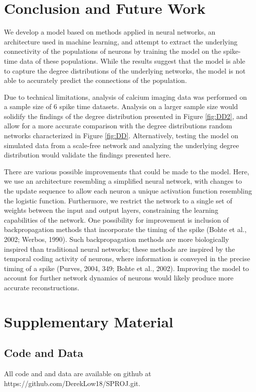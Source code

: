 \documentclass[11pt,titlepage]{article}
\begin{document}
\clearpage
\section{Conclusion and Future Work}
We develop a model based on methods applied in neural networks, an architecture used in machine learning, and attempt to extract the underlying connectivity of the populations of neurons by training the model on the spike-time data of these populations. While the results suggest that the model is able to capture the degree distributions of the underlying networks, the model is not able to accurately predict the connections of the population.\par
Due to technical limitations, analysis of calcium imaging data was performed on a sample size of 6 spike time datasets. Analysis on a larger sample size would solidify the findings of the degree distribution presented in Figure \ref{fig:DD2}, and allow for a more accurate comparison with the degree distributions random networks characterized in Figure \ref{fig:DD}. Alternatively, testing the model on simulated data from a scale-free network and analyzing the underlying degree distribution would validate the findings presented here.\par
	There are various possible improvements that could be made to the model. Here, we use an architecture resembling a simplified neural network, with changes to the update sequence to allow each neuron a unique activation function resembling the logistic function. Furthermore, we restrict the network to a single set of weights between the input and output layers, constraining the learning capabilities of the network. One possibility for improvement is inclusion of backpropagation methods that incorporate the timing of the spike (Bohte et al., 2002; Werbos, 1990). Such backpropagation methods are more biologically inspired than traditional neural networks; these methods are inspired by the temporal coding activity of neurons, where information is conveyed in the precise timing of a spike (Purves, 2004, 349; Bohte et al., 2002). Improving the model to account for further network dynamics of neurons would likely produce more accurate reconstructions.\par


\clearpage
\section{Supplementary Material}
\subsection{Code and Data}
All code and and data are available on github at https://github.com/DerekLow18/SPROJ.git.
\end{document}
